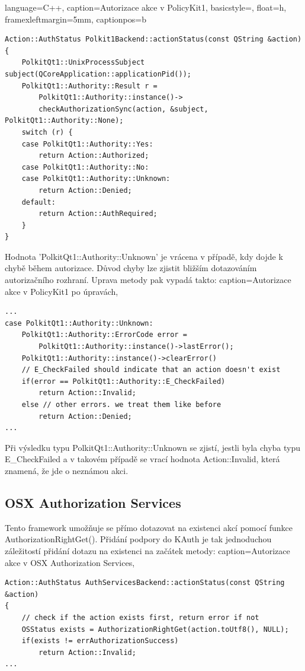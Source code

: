 \renewcommand*\lstlistingname{Výpis}
\lstset
{
    language=C++,
    caption=Autorizace akce v PolicyKit1,
    basicstyle=\footnotesize,
    float=h,
    framexleftmargin=5mm,
    captionpos=b
}
\begin{lstlisting}
Action::AuthStatus Polkit1Backend::actionStatus(const QString &action)
{
    PolkitQt1::UnixProcessSubject subject(QCoreApplication::applicationPid());
    PolkitQt1::Authority::Result r =
        PolkitQt1::Authority::instance()->
        checkAuthorizationSync(action, &subject, PolkitQt1::Authority::None);
    switch (r) {
    case PolkitQt1::Authority::Yes:
        return Action::Authorized;
    case PolkitQt1::Authority::No:
    case PolkitQt1::Authority::Unknown:
        return Action::Denied;
    default:
        return Action::AuthRequired;
    }
}
\end{lstlisting}
Hodnota 'PolkitQt1::Authority::Unknown' je vrácena v případě, kdy dojde k chybě
během autorizace. Důvod chyby lze zjistit bližším dotazováním autorizačního
rozhraní. Uprava metody pak vypadá takto:
\lstset
{
    caption=Autorizace akce v PolicyKit1 po úpravách,
}
\begin{lstlisting}
...
case PolkitQt1::Authority::Unknown:
    PolkitQt1::Authority::ErrorCode error =
        PolkitQt1::Authority::instance()->lastError();
    PolkitQt1::Authority::instance()->clearError()
    // E_CheckFailed should indicate that an action doesn't exist
    if(error == PolkitQt1::Authority::E_CheckFailed)
        return Action::Invalid;
    else // other errors. we treat them like before
        return Action::Denied;
...
\end{lstlisting}

Při výsledku typu PolkitQt1::Authority::Unknown se zjistí, jestli byla chyba
typu E\_CheckFailed a v takovém případě se vrací hodnota Action::Invalid,
která znamená, že jde o neznámou akci.
\subsection{OSX Authorization Services}
Tento framework umožňuje se přímo dotazovat na existenci akcí pomocí funkce
AuthorizationRightGet(). Přidání podpory do KAuth je tak jednoduchou záležitostí
přidání dotazu na existenci na začátek metody:
\lstset
{
    caption=Autorizace akce v OSX Authorization Services,
}
\begin{lstlisting}
Action::AuthStatus AuthServicesBackend::actionStatus(const QString &action)
{
    // check if the action exists first, return error if not
    OSStatus exists = AuthorizationRightGet(action.toUtf8(), NULL);
    if(exists != errAuthorizationSuccess)
        return Action::Invalid;
...
\end{lstlisting}

